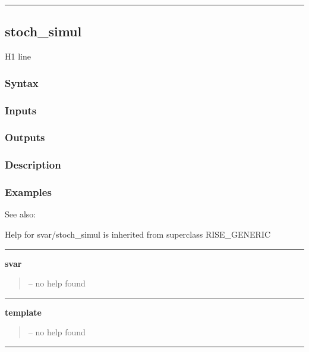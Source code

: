 \documentclass[letterpaper,10pt,english]{sphinxmanual}
\begin{document}
\bigskip\hrule{}\bigskip



\subsection{stoch\_simul}
\label{classes/models/@svar/svar:id131}\label{classes/models/@svar/svar:stoch-simul}
H1 line


\subsubsection{Syntax}
\label{classes/models/@svar/svar:id132}

\subsubsection{Inputs}
\label{classes/models/@svar/svar:id133}

\subsubsection{Outputs}
\label{classes/models/@svar/svar:id134}

\subsubsection{Description}
\label{classes/models/@svar/svar:id135}

\subsubsection{Examples}
\label{classes/models/@svar/svar:id136}
See also:

Help for svar/stoch\_simul is inherited from superclass RISE\_GENERIC


\bigskip\hrule{}\bigskip

\label{classes/models/@svar/svar:svar}
\textbf{svar}
\begin{quote}

-- no help found
\end{quote}


\bigskip\hrule{}\bigskip

\label{classes/models/@svar/svar:template}
\textbf{template}
\begin{quote}

-- no help found
\end{quote}


\bigskip\hrule{}\bigskip
\end{document}
